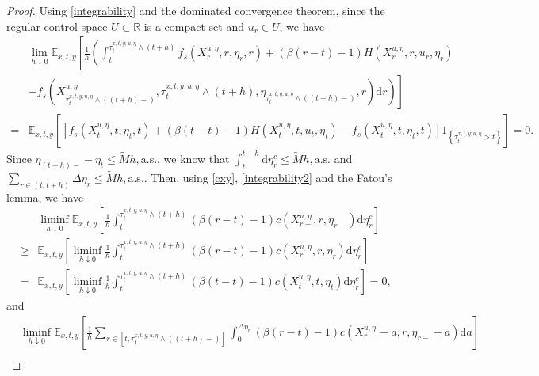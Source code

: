 \documentclass[11pt,reqno]{article}%
\numberwithin{equation}{section}
\begin{document}
\begin{proof}
Using \eqref{integrability} and the dominated convergence theorem, since the regular control space $U\subset\mathbb{R}$ is a compact set and $u_r\in U$, we have 
\begin{equation}\begin{aligned}
&\lim\limits_{h\downarrow 0}\mathbb{E}_{x,t,y}\left[\frac{1}{h}\left(\int_{t}^{\tau^{x,t,y;u,\eta}_{t}\wedge(t+h)}f_s\left(X^{u,\eta}_{r},r,\eta_{r},r\right)+(\beta(r-t)-1) H\left(X^{u,\eta}_r, r,u_r, \eta_r \right) \right.\right.\\
  &\left.\left.-f_s\left(X^{u,\eta}_{\tau^{x,t,y;u,\eta}_{t}\wedge((t+h)-)},\tau^{x,t,y;u,\eta}_{t}\wedge(t+h),\eta_{\tau^{x,t,y;u,\eta}_{t}\wedge((t+h)-)},r\right)\mathrm{d}r\right)\right]\\
=&\mathbb{E}_{x,t,y}\left[\left[f_s\left(X^{u,\eta}_{t},t,\eta_{t},t\right)+ (\beta(t-t)-1)H\left(X^{u,\eta}_t, t,u_t, \eta_t \right)-f_s\left(X^{u,\eta}_{t},t,\eta_{t},t\right)\right]1_{\left\{\tau^{x,t,y;u,\eta}_{t}>t\right\}} \right]=0.
\end{aligned}\label{est1}\end{equation}
Since $\eta_{(t+h)-}-\eta_{t}\le \tilde{M}h, \text{a.s.}$, we know that $\int_{t}^{t+h}\mathrm{d}\eta^{c}_{r}\le \tilde{M}h, \text{a.s.}$ and $\sum\limits_{r\in(t,t+h)}\Delta\eta_{r}\le \tilde{M}h, \text{a.s.}$. Then, using \eqref{cxy}, \eqref{integrability2} and the Fatou's lemma, we have
\begin{equation}\begin{aligned}
&\liminf\limits_{h\downarrow 0}\mathbb{E}_{x,t,y}\left[\frac{1}{h}\int_{t}^{\tau^{x,t,y;u,\eta}_{t}\wedge(t+h)}\left(\beta(r-t)-1\right) c\left(X^{u,\eta}_{r-}, r, \eta_{r-}\right) \mathrm{d}\eta^{c}_r\right]\\
\geq&\mathbb{E}_{x,t,y}\left[\liminf\limits_{h\downarrow 0}\frac{1}{h}\int_{t}^{\tau^{x,t,y;u,\eta}_{t}\wedge(t+h)}\left(\beta(r-t)-1\right) c\left(X^{u,\eta}_{r}, r, \eta_{r}\right)\mathrm{d}\eta^{c}_r \right]\\
=&\mathbb{E}_{x,t,y}\left[ \liminf\limits_{h\downarrow 0}\frac{1}{h}\int_{t}^{\tau^{x,t,y;u,\eta}_{t}\wedge(t+h)}\left(\beta(t-t)-1\right) c(X^{u,\eta}_t, t, \eta_t)\mathrm{d}\eta^{c}_{r}\right]= 0,
\end{aligned}\label{est2}\end{equation}
and
\begin{equation}\begin{aligned}
&\liminf\limits_{h\downarrow 0}\mathbb{E}_{x,t,y}\left[\frac{1}{h}\sum\limits_{r\in[t,\tau^{x,t,y;u,\eta}_{t}\wedge((t+h)-)]}\int_{0}^{\Delta\eta_{r}}\left(\beta(r-t)-1\right) c\left(X^{u,\eta}_{r-}-a, r, \eta_{r-}+a\right)\mathrm{d}a\right]\\

\end{aligned}
\end{equation}
\end{proof}
\end{document}
